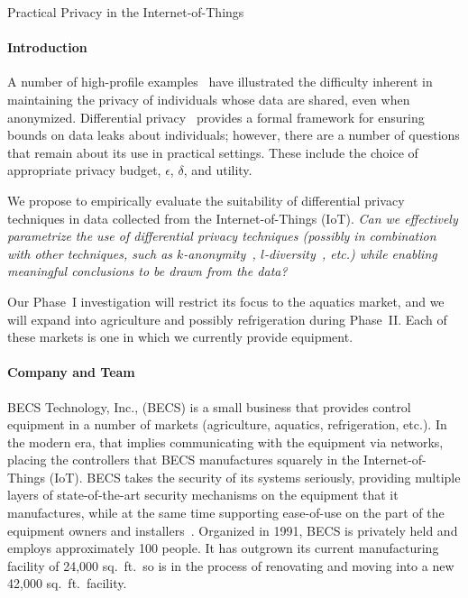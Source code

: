 \centerline{\Large Practical Privacy in the Internet-of-Things}

\paragraph{Introduction}
\label{sec:intro}

A number of high-profile examples~\cite{bz06,bk07} have illustrated
the difficulty inherent in maintaining the privacy of individuals
whose data are shared, even when anonymized.
Differential privacy~\cite{dwork11,dr14} provides a formal
framework for ensuring bounds on data leaks about individuals; however,
there are a number of questions that remain about its use in practical
settings.  These include the choice of appropriate privacy budget,
$\epsilon$, $\delta$, and utility.

We propose to empirically evaluate the suitability of differential
privacy techniques in data collected from the Internet-of-Things (IoT).
\emph{Can we effectively parametrize the use of differential privacy techniques
(possibly in combination with other techniques, such as
$k$-anonymity~\cite{samarati01,sweeney02},
$l$-diversity~\cite{mkgv07}, etc.)
while enabling meaningful conclusions to be drawn from the data?}

Our Phase~I investigation will restrict its focus to the aquatics market,
and we will expand into agriculture and possibly refrigeration during
Phase~II. Each of these markets is one in which we currently provide
equipment.

\paragraph{Company and Team}
\label{sec:team}

BECS Technology, Inc., (BECS) is a small business that provides
control equipment in
a number of markets (agriculture, aquatics, refrigeration, etc.).
In the modern era, that implies communicating with the equipment via
networks, placing the controllers that BECS manufactures squarely in
the Internet-of-Things (IoT).
BECS takes the security of its systems seriously, providing multiple
layers of state-of-the-art security mechanisms on the
equipment that it manufactures, while at the same time supporting
ease-of-use on the part of the equipment owners and installers~\cite{ccgss16}.
Organized in 1991, BECS is privately held and employs approximately 100
people. It has outgrown its current
manufacturing facility of 24,000 sq.~ft.\ so is in the process of
renovating and moving into a new 42,000 sq.~ft.\ facility.

